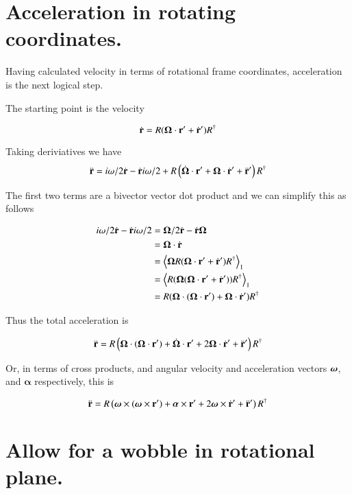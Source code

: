 \documentclass{article}      %
\newcommand{\dt}[1]{\dot{#1}}
\newcommand{\ddt}[1]{\ddot{#1}}
\newcommand{\Balpha}[0]{\boldsymbol{\alpha}}
\newcommand{\gpgradeone}[1] {{\left\langle{{#1}}\right\rangle}_{1}}
\newcommand{\BOmega}[0]{\boldsymbol{\Omega}}
\begin{document}
\section{ Acceleration in rotating coordinates. }

Having calculated velocity in terms of rotational frame coordinates, acceleration is the next
logical step.

The starting point is the velocity

\[
\dt{\Br} = R ( \BOmega \cdot \Br' + \dt{\Br}' ) R^\dagger
\]

Taking deriviatives we have
\[
\ddt{\Br} = i \omega /2 \dt{\Br} - \dt{\Br} i \omega /2 + R \left( \dot{\BOmega} \cdot \Br' + \BOmega \cdot \dt{\Br}' + \ddt{\Br}' \right) R^\dagger
\]

The first two terms are a bivector vector dot product and we can simplify this as follows

\begin{align*}
i \omega /2 \dt{\Br} - \dt{\Br} i \omega /2
&= \BOmega /2 \dt{\Br} - \dt{\Br} \BOmega \\
&= \BOmega \cdot \dt{\Br} \\
&= \gpgradeone{ \BOmega R ( \BOmega \cdot \Br' + \dt{\Br}' ) R^\dagger } \\
&= \gpgradeone{ R ( \BOmega (\BOmega \cdot \Br' + \dt{\Br}') ) R^\dagger } \\
&= R ( \BOmega \cdot (\BOmega \cdot \Br') + \BOmega \cdot \dt{\Br}') R^\dagger \\
\end{align*}

Thus the total acceleration is

\begin{equation}
\ddt{\Br} = R \left( \BOmega \cdot (\BOmega \cdot \Br') +\dot{\BOmega} \cdot \Br' + 2 \BOmega \cdot \dt{\Br}' + \ddt{\Br}' \right) R^\dagger
\end{equation}

Or, in terms of cross products, and angular velocity and acceleration vectors $\boldsymbol{\omega}$, and $\Balpha$ respectively, this is

\begin{equation}\label{eqn:accelerationfixedrotplane}
\ddt{\Br} = R \left( \Bomega \cross (\Bomega \cross \Br') + \Balpha \cross \Br' + 2 \Bomega \cross \dt{\Br}' + \ddt{\Br}' \right) R^\dagger
\end{equation}

\section{ Allow for a wobble in rotational plane. }
\end{document}
